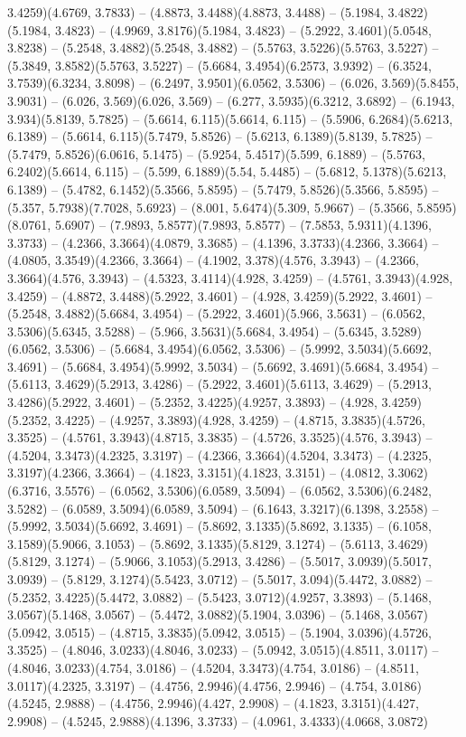3.4259)(4.6769, 3.7833) -- (4.8873, 3.4488)(4.8873, 3.4488) -- (5.1984, 3.4822)(5.1984, 3.4823) -- (4.9969, 3.8176)(5.1984, 3.4823) -- (5.2922, 3.4601)(5.0548, 3.8238) -- (5.2548, 3.4882)(5.2548, 3.4882) -- (5.5763, 3.5226)(5.5763, 3.5227) -- (5.3849, 3.8582)(5.5763, 3.5227) -- (5.6684, 3.4954)(6.2573, 3.9392) -- (6.3524, 3.7539)(6.3234, 3.8098) -- (6.2497, 3.9501)(6.0562, 3.5306) -- (6.026, 3.569)(5.8455, 3.9031) -- (6.026, 3.569)(6.026, 3.569) -- (6.277, 3.5935)(6.3212, 3.6892) -- (6.1943, 3.934)(5.8139, 5.7825) -- (5.6614, 6.115)(5.6614, 6.115) -- (5.5906, 6.2684)(5.6213, 6.1389) -- (5.6614, 6.115)(5.7479, 5.8526) -- (5.6213, 6.1389)(5.8139, 5.7825) -- (5.7479, 5.8526)(6.0616, 5.1475) -- (5.9254, 5.4517)(5.599, 6.1889) -- (5.5763, 6.2402)(5.6614, 6.115) -- (5.599, 6.1889)(5.54, 5.4485) -- (5.6812, 5.1378)(5.6213, 6.1389) -- (5.4782, 6.1452)(5.3566, 5.8595) -- (5.7479, 5.8526)(5.3566, 5.8595) -- (5.357, 5.7938)(7.7028, 5.6923) -- (8.001, 5.6474)(5.309, 5.9667) -- (5.3566, 5.8595)(8.0761, 5.6907) -- (7.9893, 5.8577)(7.9893, 5.8577) -- (7.5853, 5.9311)(4.1396, 3.3733) -- (4.2366, 3.3664)(4.0879, 3.3685) -- (4.1396, 3.3733)(4.2366, 3.3664) -- (4.0805, 3.3549)(4.2366, 3.3664) -- (4.1902, 3.378)(4.576, 3.3943) -- (4.2366, 3.3664)(4.576, 3.3943) -- (4.5323, 3.4114)(4.928, 3.4259) -- (4.5761, 3.3943)(4.928, 3.4259) -- (4.8872, 3.4488)(5.2922, 3.4601) -- (4.928, 3.4259)(5.2922, 3.4601) -- (5.2548, 3.4882)(5.6684, 3.4954) -- (5.2922, 3.4601)(5.966, 3.5631) -- (6.0562, 3.5306)(5.6345, 3.5288) -- (5.966, 3.5631)(5.6684, 3.4954) -- (5.6345, 3.5289)(6.0562, 3.5306) -- (5.6684, 3.4954)(6.0562, 3.5306) -- (5.9992, 3.5034)(5.6692, 3.4691) -- (5.6684, 3.4954)(5.9992, 3.5034) -- (5.6692, 3.4691)(5.6684, 3.4954) -- (5.6113, 3.4629)(5.2913, 3.4286) -- (5.2922, 3.4601)(5.6113, 3.4629) -- (5.2913, 3.4286)(5.2922, 3.4601) -- (5.2352, 3.4225)(4.9257, 3.3893) -- (4.928, 3.4259)(5.2352, 3.4225) -- (4.9257, 3.3893)(4.928, 3.4259) -- (4.8715, 3.3835)(4.5726, 3.3525) -- (4.5761, 3.3943)(4.8715, 3.3835) -- (4.5726, 3.3525)(4.576, 3.3943) -- (4.5204, 3.3473)(4.2325, 3.3197) -- (4.2366, 3.3664)(4.5204, 3.3473) -- (4.2325, 3.3197)(4.2366, 3.3664) -- (4.1823, 3.3151)(4.1823, 3.3151) -- (4.0812, 3.3062)(6.3716, 3.5576) -- (6.0562, 3.5306)(6.0589, 3.5094) -- (6.0562, 3.5306)(6.2482, 3.5282) -- (6.0589, 3.5094)(6.0589, 3.5094) -- (6.1643, 3.3217)(6.1398, 3.2558) -- (5.9992, 3.5034)(5.6692, 3.4691) -- (5.8692, 3.1335)(5.8692, 3.1335) -- (6.1058, 3.1589)(5.9066, 3.1053) -- (5.8692, 3.1335)(5.8129, 3.1274) -- (5.6113, 3.4629)(5.8129, 3.1274) -- (5.9066, 3.1053)(5.2913, 3.4286) -- (5.5017, 3.0939)(5.5017, 3.0939) -- (5.8129, 3.1274)(5.5423, 3.0712) -- (5.5017, 3.094)(5.4472, 3.0882) -- (5.2352, 3.4225)(5.4472, 3.0882) -- (5.5423, 3.0712)(4.9257, 3.3893) -- (5.1468, 3.0567)(5.1468, 3.0567) -- (5.4472, 3.0882)(5.1904, 3.0396) -- (5.1468, 3.0567)(5.0942, 3.0515) -- (4.8715, 3.3835)(5.0942, 3.0515) -- (5.1904, 3.0396)(4.5726, 3.3525) -- (4.8046, 3.0233)(4.8046, 3.0233) -- (5.0942, 3.0515)(4.8511, 3.0117) -- (4.8046, 3.0233)(4.754, 3.0186) -- (4.5204, 3.3473)(4.754, 3.0186) -- (4.8511, 3.0117)(4.2325, 3.3197) -- (4.4756, 2.9946)(4.4756, 2.9946) -- (4.754, 3.0186)(4.5245, 2.9888) -- (4.4756, 2.9946)(4.427, 2.9908) -- (4.1823, 3.3151)(4.427, 2.9908) -- (4.5245, 2.9888)(4.1396, 3.3733) -- (4.0961, 3.4333)(4.0668, 3.0872) 